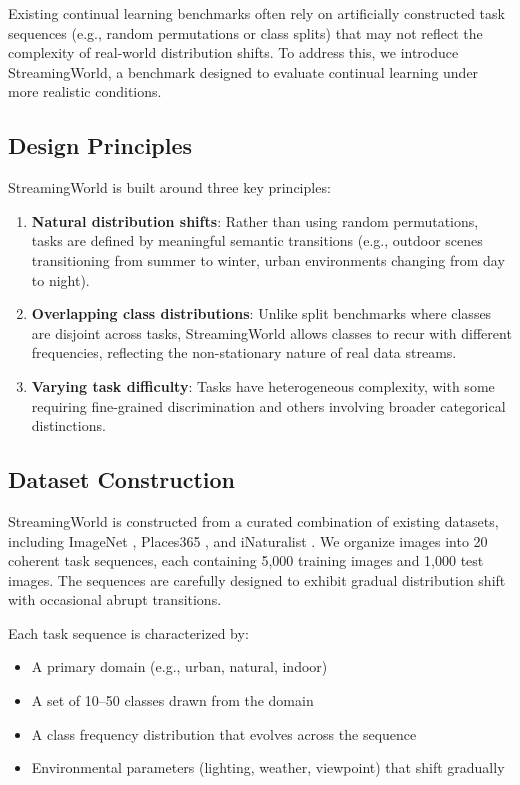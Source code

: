 \documentclass[11pt]{article}
\begin{document}
Existing continual learning benchmarks often rely on artificially constructed task sequences (e.g., random permutations or class splits) that may not reflect the complexity of real-world distribution shifts. To address this, we introduce StreamingWorld, a benchmark designed to evaluate continual learning under more realistic conditions.

\subsection{Design Principles}

StreamingWorld is built around three key principles:
\begin{enumerate}
    \item \textbf{Natural distribution shifts}: Rather than using random permutations, tasks are defined by meaningful semantic transitions (e.g., outdoor scenes transitioning from summer to winter, urban environments changing from day to night).
    \item \textbf{Overlapping class distributions}: Unlike split benchmarks where classes are disjoint across tasks, StreamingWorld allows classes to recur with different frequencies, reflecting the non-stationary nature of real data streams.
    \item \textbf{Varying task difficulty}: Tasks have heterogeneous complexity, with some requiring fine-grained discrimination and others involving broader categorical distinctions.
\end{enumerate}

\subsection{Dataset Construction}

StreamingWorld is constructed from a curated combination of existing datasets, including ImageNet \citep{deng2009imagenet}, Places365 \citep{zhou2017places}, and iNaturalist \citep{van2018inaturalist}. We organize images into 20 coherent task sequences, each containing 5,000 training images and 1,000 test images. The sequences are carefully designed to exhibit gradual distribution shift with occasional abrupt transitions.

Each task sequence is characterized by:
\begin{itemize}
    \item A primary domain (e.g., urban, natural, indoor)
    \item A set of 10--50 classes drawn from the domain
    \item A class frequency distribution that evolves across the sequence
    \item Environmental parameters (lighting, weather, viewpoint) that shift gradually
\end{itemize}
\end{document}

